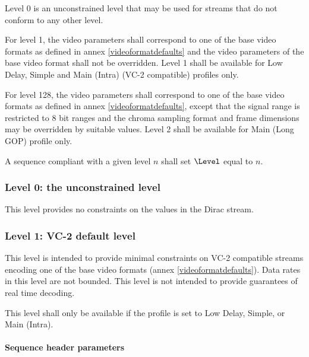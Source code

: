 Level 0 is an unconstrained level that may be used for streams that do not 
conform to any other level. 

For level 1, the video parameters shall correspond 
to one of the base video formats as defined in annex \ref{videoformatdefaults} 
and the video parameters
of the base video format shall not be overridden. Level 1 shall be available
for Low Delay, Simple and Main (Intra) (VC-2 compatible) profiles only.

For level 128, the video parameters shall correspond to one of the base video
formats as defined in annex \ref{videoformatdefaults}, 
except that the signal range is restricted
to 8 bit ranges and the chroma sampling format and frame dimensions may be
overridden by suitable values. Level 2 shall be available for Main (Long GOP)
profile only.

A sequence compliant with a given level $n$ shall set $\Level$ equal to $n$.

\subsubsection{Level 0: the unconstrained level}

This level provides no constraints on the values in the Dirac stream.

\subsubsection{Level 1: VC-2 default level}

This level is intended to provide minimal constraints on VC-2 compatible
streams encoding one of the base video formats 
(annex \ref{videoformatdefaults}). Data rates in 
this level are not bounded. This level is not intended to provide
guarantees of real time decoding.

This level shall only be available if the profile is set to Low Delay, Simple, or
Main (Intra).

\paragraph{Sequence header parameters\newline}

